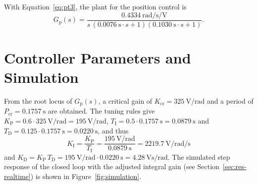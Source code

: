 With Equation~\eqref{eq:pt3}, the plant for the position control is
\begin{equation*}
  G_\mathrm{p}(s) = \frac{\qty{0.4334}{\radian\per\second\per\volt}}
  {s\,(\qty{0.0076}{\second} \cdot s + 1)(\qty{0.1030}{\second} \cdot s + 1)}.
\end{equation*}

\section{Controller Parameters and Simulation}\label{sec:res-simulation}
From the root locus of $G_\mathrm{p}(s)$, a critical gain of
$K_\mathrm{cr} = \qty{325}{\volt\per\radian}$ and a period of
$P_\mathrm{cr} = \qty{0.1757}{\second}$ are obtained. The tuning rules give
$K_\mathrm{P} = 0.6 \cdot \qty{325}{\volt\per\radian} = \qty{195}{\volt\per\radian}$,
$T_\mathrm{I} = 0.5 \cdot \qty{0.1757}{\second} = \qty{0.0879}{\second}$ and
$T_\mathrm{D} = 0.125 \cdot \qty{0.1757}{\second} = \qty{0.0220}{\second}$, and thus
\begin{equation*}
  K_\mathrm{I} = \frac{K_\mathrm{P}}{T_\mathrm{I}}
  = \frac{\qty{195}{\volt\per\radian}}{\qty{0.0879}{\second}}
  = \qty{2219.7}{\volt\per\radian\per\second}
\end{equation*}
and $K_\mathrm{D} = K_\mathrm{P}\,T_\mathrm{D}
= \qty{195}{\volt\per\radian} \cdot \qty{0.0220}{\second}
= \qty{4.28}{\volt\second\per\radian}$.
The simulated step response of the closed loop with the adjusted integral gain
(see Section~\ref{sec:res-realtime}) is shown in Figure~\ref{fig:simulation}.

